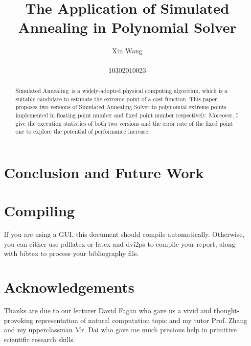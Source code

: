 \documentclass[twocolumn]{article}
\newcommand{\SA}{Simulated Annealing~}
\begin{document}
\title{{\bf The Application of Simulated Annealing in Polynomial Solver}\\ }

\author{Xin Wang\\ \vspace{0.5cm}\\
 10302010023}

\date{}
\maketitle
\begin{abstract}
\SA is a widely-adopted physical computing algorithm, which is a suitable candidate to estimate the extreme point of a cost function. This paper proposes two versions of Simulated Annealing Solver to polynomial extreme points implemented in floating point number and fixed point number respectively. Moreover, I give the execution statistics of both two versions and the error rate of the fixed point one to explore the potential of performance increase.
\end{abstract}











\section{Conclusion and Future Work}
\label{sec:conclusion}

\section{Compiling}

If you are using a GUI, this document should compile automatically. Otherwise,
you can either use pdflatex or latex and dvi2ps to compile your report, along
with bibtex to process your bibliography file.

\section{Acknowledgements}
Thanks are due to our lecturer David Fagan who gave us a vivid and thought-provoking representation of natural computation topic and my tutor Prof. Zhang and my upperclassman Mr. Dai who gave me much precious help in primitive scientific research skills.



\end{document}
